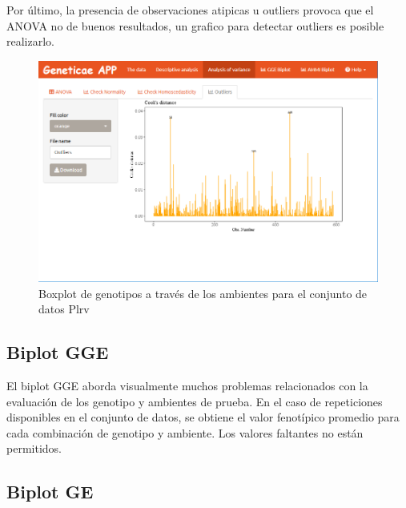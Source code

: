 Por último, la presencia de observaciones atipicas u outliers provoca que el ANOVA no de buenos resultados, un grafico para detectar outliers es posible realizarlo.

\begin{figure}[H]
	\begin{center}
		\includegraphics[width=17cm]{./Graficos/Outliers.png}
	\end{center}
	\caption{Boxplot de genotipos a través de los ambientes para el conjunto de datos Plrv}
	\label{fig:fig49}
\end{figure}

\subsection{Biplot GGE}
El biplot GGE aborda visualmente muchos problemas relacionados con la evaluación de los genotipo y ambientes de prueba. En el caso de repeticiones disponibles en el conjunto de datos, se obtiene el valor fenotípico promedio para cada combinación de genotipo y ambiente. Los valores faltantes no están permitidos.


\subsection{Biplot GE}

